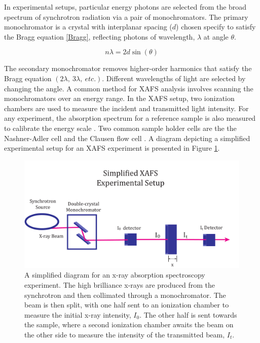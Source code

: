 In experimental setups, particular energy photons are selected from the broad spectrum of synchrotron radiation via a pair of monochromators. The primary monochromator is a crystal with interplanar spacing ($ d $) chosen specify to satisfy the Bragg equation \ref{Bragg}, reflecting photons of wavelength, $ \lambda $ at angle $ \theta $.  

\begin{equation}
    \label{Bragg}
    n\lambda = 2d\sin(\theta)
\end{equation}

The secondary monochromator removes higher-order harmonics that satisfy the Bragg equation $ (2\lambda,~3\lambda,~etc.). $ Different wavelengths of light are selected by changing the angle. A common method for XAFS analysis involves scanning the monochromators over an energy range. In the XAFS setup, two ionization chambers are used to measure the incident and transmitted light intensity. For any experiment, the absorption spectrum for a reference sample is also measured to calibrate the energy scale \cite{exafsxanes1988}. Two common sample holder cells are the the Nashner-Adler cell and the Clausen flow cell \cite{nicks-thesis}. A diagram depicting a simplified experimental setup for an XAFS experiment is presented in Figure \ref{fig:xafs-setup}.  

\begin{figure}[h]
    \centering
    \includegraphics[width=\linewidth]{Chapters/Figures/synchrotron-diagram.pdf}
    \caption[Example XAFS Experiment Setup]{A simplified diagram for an x-ray absorption spectroscopy experiment. The high brilliance x-rays are produced from the synchrotron and then collimated through a monochromator. The beam is then split, with one half sent to an ionization chamber to measure the initial x-ray intensity, $ I_0 $. The other half is sent towards the sample, where a second ionization chamber awaits the beam on the other side to measure the intensity of the transmitted beam, $ I_t $.}
    \label{fig:xafs-setup}
\end{figure}

